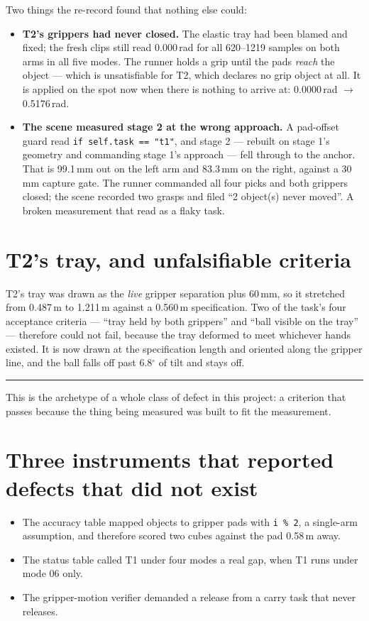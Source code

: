 \documentclass[11pt,a4paper,oneside]{report}
\newcommand{\code}[1]{\texttt{\small #1}}
\newcommand{\dg}{$^{\circ}$}
\newcommand{\keyfact}[1]{%
  \par\vspace{7pt}\noindent
  \hspace*{0pt}\textcolor{srlblue}{\rule{2.5pt}{\dimexpr\baselineskip\relax}}%
  \hspace{9pt}%
  \begin{minipage}[t]{\dimexpr\textwidth-14pt\relax}
  \small #1
  \end{minipage}\par\vspace{7pt}}
\begin{document}
Two things the re-record found that nothing else could:

\begin{itemize}
\item \textbf{T2's grippers had never closed.} The elastic tray had been blamed
      and fixed; the fresh clips still read 0.000\,rad for all 620--1219 samples
      on both arms in all five modes. The runner holds a grip until the pads
      \emph{reach} the object --- which is unsatisfiable for T2, which declares
      no grip object at all. It is applied on the spot now when there is nothing
      to arrive at: 0.0000\,rad $\rightarrow$ 0.5176\,rad.
\item \textbf{The scene measured stage 2 at the wrong approach.} A pad-offset
      guard read \code{if self.task == "t1"}, and stage 2 --- rebuilt on stage
      1's geometry and commanding stage 1's approach --- fell through to the
      anchor. That is 99.1\,mm out on the left arm and 83.3\,mm on the right,
      against a 30\,mm capture gate. The runner commanded all four picks and
      both grippers closed; the scene recorded two grasps and filed ``2
      object(s) never moved''. A broken measurement that read as a flaky task.
\end{itemize}

\section{T2's tray, and unfalsifiable criteria}

T2's tray was drawn as the \emph{live} gripper separation plus 60\,mm, so it
stretched from 0.487\,m to 1.211\,m against a 0.560\,m specification. Two of the
task's four acceptance criteria --- ``tray held by both grippers'' and ``ball
visible on the tray'' --- therefore could not fail, because the tray deformed to
meet whichever hands existed. It is now drawn at the specification length and
oriented along the gripper line, and the ball falls off past 6.8\dg{} of tilt
and stays off.

\keyfact{This is the archetype of a whole class of defect in this project: a
criterion that passes because the thing being measured was built to fit the
measurement.}

\section{Three instruments that reported defects that did not exist}

\begin{itemize}
\item The accuracy table mapped objects to gripper pads with \code{i \% 2}, a
      single-arm assumption, and therefore scored two cubes against the pad
      0.58\,m away.
\item The status table called T1 under four modes a real gap, when T1 runs
      under mode 06 only.
\item The gripper-motion verifier demanded a release from a carry task that
      never releases.
\end{itemize}
\end{document}
